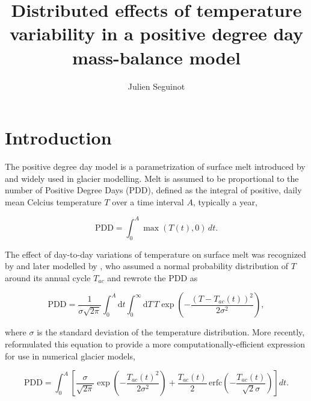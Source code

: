 \documentclass[twocolumn]{igs}
\begin{document}
\title[Temperature variability in a positive degree day model]{Distributed effects of temperature variability in a positive degree day mass-balance model}
\author[J. Seguinot]{Julien Seguinot}

\maketitle


\section{Introduction}

The positive degree day model is a parametrization of surface melt introduced by \citet{braithwaite-1984} and widely used in glacier modelling. Melt is assumed to be proportional to the number of Positive Degree Days (PDD), defined as the integral of positive, daily mean Celcius temperature $T$ over a time interval $A$, typically a year,

\begin{equation} \label{eq:pdd}
  \mathrm{PDD} = \int_{0}^{A}\max(T(t),0)\,dt.
\end{equation}

The effect of day-to-day variations of temperature on surface melt was recognized by \citet{braithwaite-1984} and later modelled by \citet{reeh-1991}, who assumed a normal probability distribution of $T$ around its annual cycle $T_{ac}$ and rewrote the PDD as

\begin{equation} \label{eq:reeh}
  \mathrm{PDD} = \frac{1}{\sigma\sqrt{2\pi}}
    \int_{0}^{A} \mathrm{d}t
    \int_{0}^{\infty} \mathrm{d}T \,
    T \exp\left({-\frac{(T-T_{ac}(t))^2}{2\sigma^2}}\right),
\end{equation}

where $\sigma$ is the standard deviation of the temperature distribution. More recently, \citet{calov-greve-2005} reformulated this equation to provide a more computationally-efficient expression for use in numerical glacier models,

\begin{equation} \label{eq:calovgreve}
  \mathrm{PDD} = \int_{0}^{A} \left[
    \frac{\sigma}{\sqrt{2\pi}}
    \exp\left({-\frac{T_{ac}(t)^2}{2\sigma^2}}\right)
    +\frac{T_{ac}(t)}{2} \,
    \mathrm{erfc} \left(-\frac{T_{ac}(t)}{\sqrt{2}\sigma}\right)
  \right]dt.
\end{equation}
\end{document}
